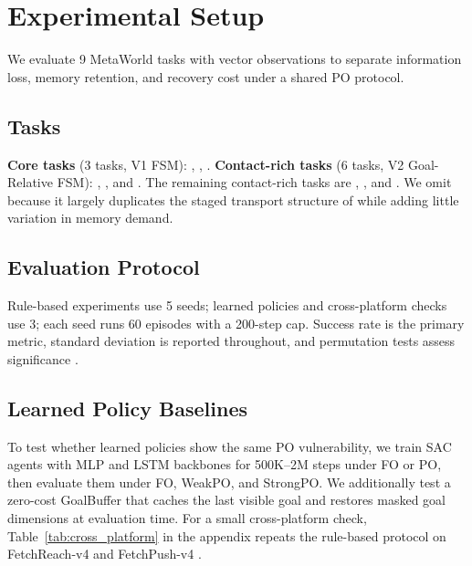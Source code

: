 \section{Experimental Setup}
\label{sec:experimental-setup}

We evaluate 9 MetaWorld \citep{Yu2020} tasks with vector observations to separate information loss, memory retention, and recovery cost under a shared PO protocol.

\subsection{Tasks}

\textbf{Core tasks} (3 tasks, V1 FSM): , , . \textbf{Contact-rich tasks} (6 tasks, V2 Goal-Relative FSM): , , and . The remaining contact-rich tasks are , , and . We omit  because it largely duplicates the staged transport structure of  while adding little variation in memory demand.

\subsection{Evaluation Protocol}

Rule-based experiments use 5 seeds; learned policies and cross-platform checks use 3; each seed runs 60 episodes with a 200-step cap. Success rate is the primary metric, standard deviation is reported throughout, and permutation tests assess significance \citep{Good2005}.

\subsection{Learned Policy Baselines}

To test whether learned policies show the same PO vulnerability, we train SAC \citep{Haarnoja2018} agents with MLP and LSTM \citep{Hochreiter1997} backbones for 500K--2M steps under FO or PO, then evaluate them under FO, WeakPO, and StrongPO. We additionally test a zero-cost GoalBuffer that caches the last visible goal and restores masked goal dimensions at evaluation time. For a small cross-platform check, Table~\ref{tab:cross_platform} in the appendix repeats the rule-based protocol on FetchReach-v4 and FetchPush-v4 \citep{DeLazcano2023}.
